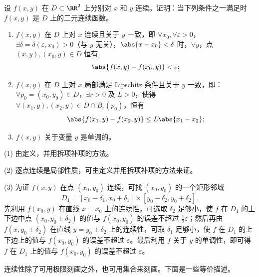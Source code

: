 \begin{xexample}[18.2.2（多元函数连续的若干充分条件）]
设 $f(x,y)$ 在 $D\subset\RR^2$ 上分别对 $x$ 和 $y$ 连续。证明：当下列条件之一满足时 $f(x,y)$ 是 $D$ 上的二元连续函数。
\begin{enumerate}[label=(\arabic*)]
  \item $f(x,y)$ 在 $D$ 上对 $x$ 连续且关于 $y$ 一致，即 $\forall x_0,\forall\varepsilon>0$，$\exists\delta=\delta(\varepsilon,x_0)>0$（与 $y$ 无关），$\abs{x-x_0}<\delta$ 时，$\forall y$，点 $(x,y),(x_0,y)\in D$ 恒有
  \[
    \abs{f(x,y)-f(x_0,y)}<\varepsilon;
  \]
  \item $f(x,y)$ 在 $D$ 上对 $x$ 局部满足 Lipschitz 条件且关于 $y$ 一致，即：$\forall p_0=(x_0,y_0)\in D$，$\exists r>0$ 及 $L>0$，使得 $\forall(x_1,y),(x_2,y)\in D\cap B_r(p_0)$，恒有
  \[
    \abs{f(x_1,y)-f(x_2,y)}\le L\abs{x_1-x_2};
  \]
  \item $f(x,y)$ 关于变量 $y$ 是单调的。
\end{enumerate}
\end{xexample}
\begin{xproof}
(1) 由定义，并用拆项补项的方法。

(2) 逐点连续是局部性质，可由定义并用拆项补项的方法来证。

(3) 为证 $f(x,y)$ 在点 $(x_0,y_0)$ 连续，可找 $(x_0,y_0)$ 的一个矩形邻域
\[
  D_1=[x_0-\delta_1,x_0+\delta_1]\times[y_0-\delta_2,y_0+\delta_2].
\]
先利用 $f(x_0,y)$ 在直线 $x=x_0$ 上的连续性，可选取 $\delta_2$ 足够小，使 $f$ 在 $D_1$ 的上下边中点 $(x_0,y_0\pm\delta_2)$ 的值与 $f(x_0,y_0)$ 的误差不超过 $\frac12\varepsilon$；然后再由 $f(x,y_0\pm\delta_2)$ 在直线 $y=y_0\pm\delta_2$ 上的连续性，可取 $\delta_1$ 足够小，使 $f$ 在 $D_1$ 的上下边上的值与 $f(x_0,y_0)$ 的误差不超过 $\varepsilon$。最后利用 $f$ 关于 $y$ 的单调性，即可得 $f$ 在 $D_1$ 上的值与 $f(x_0,y_0)$ 的误差不超过 $\varepsilon$。
\end{xproof}

连续性除了可用极限刻画之外，也可用集合来刻画。下面是一些等价描述。

